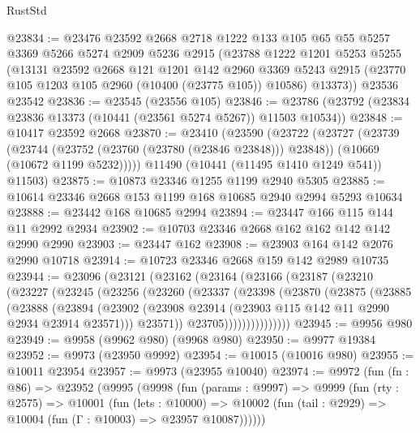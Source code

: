 \begin{lexlean}{RustStd}
\begin{coremodule}
@23834 := @23476
    @23592
    @2668
    @2718
    @1222
    @133
    @105
    @65
    @55
    @5257
    @3369
    @5266
    @5274
    @2909
    @5236
    @2915
    (@23788
      @1222
      @1201
      @5253
      @5255
      (@13131
        @23592
        @2668
        @121
        @1201
        @142
        @2960
        @3369
        @5243
        @2915
        (@23770 @105 @1203 @105 @2960 (@10400 (@23775 @105)) @10586)
        @13373))
    @23536
    @23542
@23836 := @23545 (@23556 @105)
@23846 := @23786 (@23792 (@23834 @23836 @13373 (@10441 (@23561 @5274 @5267)) @11503 @10534))
@23848 := @10417 @23592 @2668
@23870 := @23410
    (@23590
      (@23722
        (@23727
          (@23739
            (@23744 (@23752 (@23760 (@23780 (@23846 @23848))) @23848))
            (@10669 (@10672 @1199 @5232)))))
      @11490
      (@10441 (@11495 @1410 @1249 @541))
      @11503)
@23875 := @10873 @23346 @1255 @1199 @2940 @5305
@23885 := @10614 @23346 @2668 @153 @1199 @168 @10685 @2940 @2994 @5293 @10634
@23888 := @23442 @168 @10685 @2994
@23894 := @23447 @166 @115 @144 @11 @2992 @2934
@23902 := @10703 @23346 @2668 @162 @162 @142 @142 @2990 @2990
@23903 := @23447 @162
@23908 := @23903 @164 @142 @2076 @2990 @10718
@23914 := @10723 @23346 @2668 @159 @142 @2989 @10735
@23944 := @23096
    (@23121
      (@23162
        (@23164
          (@23166
            (@23187
              (@23210
                (@23227
                  (@23245
                    (@23256
                      (@23260
                        (@23337
                          (@23398
                            (@23870
                              (@23875
                                (@23885
                                  (@23888
                                    (@23894
                                      (@23902
                                        (@23908
                                          @23914
                                          (@23903 @115 @142 @11 @2990 @2934 @23914 @23571)))
                                      @23571))
                                  @23705)))))))))))))))
@23945 := @9956 @980
@23949 := @9958 (@9962 @980) (@9968 @980)
@23950 := @9977 @19384
@23952 := @9973 (@23950 @9992)
@23954 := @10015 (@10016 @980)
@23955 := @10011 @23954
@23957 := @9973 (@23955 @10040)
@23974 := @9972
    (fun (fn : @86) =>
    @23952
      (@9995
        (@9998
          (fun (params : @9997) =>
          @9999
            (fun (rty : @2575) =>
            @10001
              (fun (lets : @10000) =>
              @10002 (fun (tail : @2929) => @10004 (fun (Γ : @10003) => @23957 @10087))))))

\end{coremodule}
\end{lexlean}
